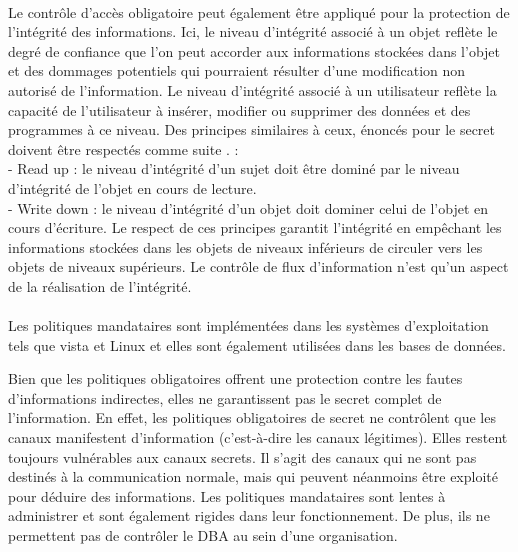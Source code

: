 \paragraph{} Le contrôle d'accès obligatoire peut également être appliqué pour la protection de l'intégrité des informations. Ici, le niveau d'intégrité associé à un objet reflète le degré de confiance que l'on peut accorder aux informations stockées dans l'objet et des dommages potentiels qui pourraient résulter d'une modification non autorisé de l'information. Le niveau d'intégrité associé à un utilisateur reflète la capacité de l'utilisateur à insérer, modifier ou supprimer des données et des programmes à ce niveau. Des principes similaires à ceux, énoncés pour le secret doivent être respectés comme suite \cite{sandhu94}. : \\
- Read up : le niveau d'intégrité d'un sujet doit être dominé par le niveau d'intégrité de l'objet en cours de lecture. \\
- Write down : le niveau d'intégrité d'un objet doit dominer celui de l'objet en cours d'écriture.
Le respect de ces principes garantit l'intégrité en empêchant les informations stockées dans les objets de niveaux inférieurs de circuler vers les objets de niveaux supérieurs. Le contrôle de flux d'information n'est qu'un aspect de la réalisation de l'intégrité.
\paragraph{} Les politiques mandataires sont implémentées dans les systèmes d'exploitation tels que vista et Linux et elles sont également utilisées dans les bases de données.


\label{sectionVulnérabilitéMAC}

Bien que les politiques obligatoires offrent une protection contre les fautes d'informations indirectes, elles ne garantissent pas le secret complet de l'information. En effet, les politiques obligatoires de secret ne contrôlent que les canaux manifestent d'information (c'est-à-dire les canaux légitimes). Elles restent toujours vulnérables aux canaux secrets. Il s'agit des canaux qui ne sont pas destinés à la communication normale, mais qui peuvent néanmoins être exploité pour déduire des informations. 
Les politiques mandataires sont lentes à administrer et sont également rigides dans leur fonctionnement. De plus, ils ne permettent pas de contrôler le DBA au sein d'une organisation.


